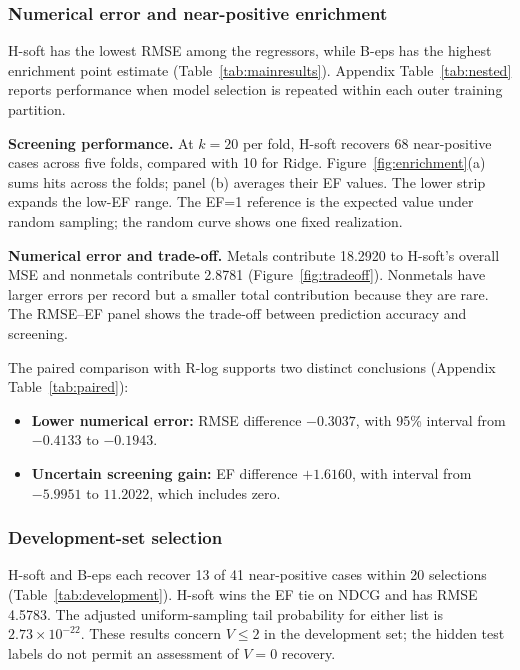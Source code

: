 \subsubsection{Numerical error and near-positive enrichment}
H-soft has the lowest RMSE among the regressors, while B-eps has the highest enrichment point estimate (Table~\ref{tab:mainresults}). Appendix Table~\ref{tab:nested} reports performance when model selection is repeated within each outer training partition.

\FloatBarrier

\textbf{Screening performance.} At $k=20$ per fold, H-soft recovers 68 near-positive cases across five folds, compared with 10 for Ridge. Figure~\ref{fig:enrichment}(a) sums hits across the folds; panel (b) averages their EF values. The lower strip expands the low-EF range. The EF=1 reference is the expected value under random sampling; the random curve shows one fixed realization.
\FloatBarrier

\textbf{Numerical error and trade-off.} Metals contribute 18.2920 to H-soft's overall MSE and nonmetals contribute 2.8781 (Figure~\ref{fig:tradeoff}). Nonmetals have larger errors per record but a smaller total contribution because they are rare. The RMSE--EF panel shows the trade-off between prediction accuracy and screening.
\FloatBarrier

\begin{samepage}
The paired comparison with R-log supports two distinct conclusions (Appendix Table~\ref{tab:paired}):
\begin{itemize}
  \item \textbf{Lower numerical error:} RMSE difference $-0.3037$, with 95\% interval from $-0.4133$ to $-0.1943$.
  \item \textbf{Uncertain screening gain:} EF difference $+1.6160$, with interval from $-5.9951$ to $11.2022$, which includes zero.
\end{itemize}
\end{samepage}

\subsubsection{Development-set selection}
H-soft and B-eps each recover 13 of 41 near-positive cases within 20 selections (Table~\ref{tab:development}). H-soft wins the EF tie on NDCG and has RMSE 4.5783. The adjusted uniform-sampling tail probability for either list is $2.73\times10^{-22}$. These results concern $V\le2$ in the development set; the hidden test labels do not permit an assessment of $V=0$ recovery.


